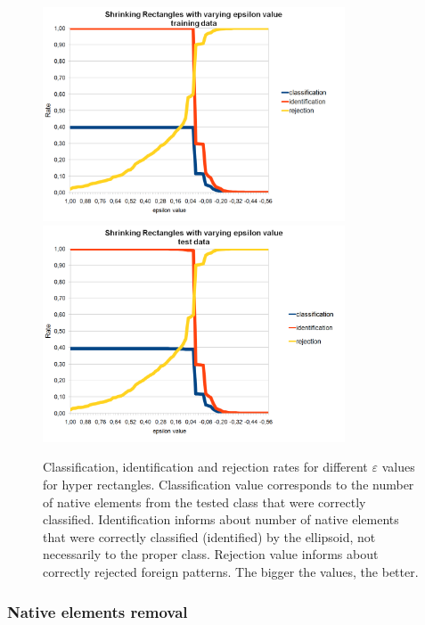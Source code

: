 \begin{figure}[htp]
\centering
\includegraphics[width=0.80\textwidth]{Figures/charts/DIGITS/DIGITS_ShrinkingRectanglesToleranceTraining.png}
\hspace{12pt}
\includegraphics[width=0.80\textwidth]{Figures/charts/DIGITS/DIGITS_ShrinkingRectanglesToleranceTest.png}
\caption{ Classification, identification and rejection rates for different $\varepsilon$ values for hyper rectangles. Classification value corresponds to the number of native elements from the tested class that were correctly classified. Identification informs about number of native elements that were correctly classified (identified) by the ellipsoid, not necessarily to the proper class. Rejection value informs about correctly rejected foreign patterns. The bigger the values, the better. }
\label{fig:shrinking_rectangles_tolerance_manipulation}\vspace{-3pt}
\end{figure}

\subsubsection{Native elements removal}


